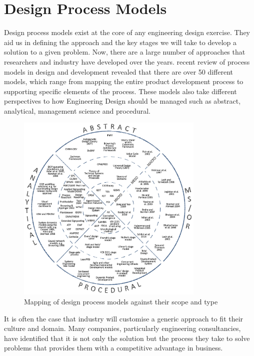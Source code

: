 \section{Design Process Models}

Design process models exist at the core of any engineering design exercise. They aid us in defining the approach and the key stages we will take to develop a solution to a given problem. Now, there are a large number of approaches that researchers and industry have developed over the years. \citeauthor{wynn2017}\cite{wynn2017} recent review of process models in design and development revealed that there are over 50 different models, which range from mapping the entire product development process to supporting specific elements of the process. These models also take different perspectives to how Engineering Design should be managed such as abstract, analytical, management science and procedural. 

\begin{figure}[h!]
  \centering
  \includegraphics[width=0.8\textwidth]{03_design_process_models/wynn-review.png}
  \caption[Mapping of design process models against their scope and type]{Mapping of design process models against their scope and type~\citep{wynn2017}}
\end{figure}


It is often the case that industry will customise a generic approach to fit their culture and domain. Many companies, particularly engineering consultancies, have identified that it is not only the solution but the process they take to solve problems that provides them with a competitive advantage in business. 

